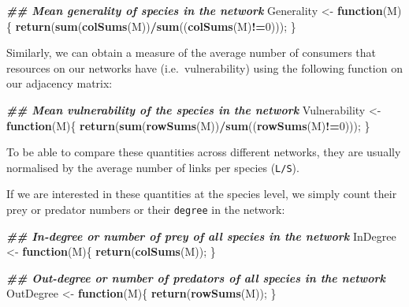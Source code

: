 \documentclass[
]{article}
\newenvironment{Shaded}{\begin{snugshade}}{\end{snugshade}}
\newcommand{\ControlFlowTok}[1]{\textcolor[rgb]{0.13,0.29,0.53}{\textbf{#1}}}
\newcommand{\DecValTok}[1]{\textcolor[rgb]{0.00,0.00,0.81}{#1}}
\newcommand{\DocumentationTok}[1]{\textcolor[rgb]{0.56,0.35,0.01}{\textbf{\textit{#1}}}}
\newcommand{\FunctionTok}[1]{\textcolor[rgb]{0.13,0.29,0.53}{\textbf{#1}}}
\newcommand{\NormalTok}[1]{#1}
\newcommand{\OtherTok}[1]{\textcolor[rgb]{0.56,0.35,0.01}{#1}}
\newcommand{\SpecialCharTok}[1]{\textcolor[rgb]{0.81,0.36,0.00}{\textbf{#1}}}
\begin{document}
\begin{Shaded}
\begin{Highlighting}[]
\DocumentationTok{\#\# Mean generality of species in the network}
\NormalTok{Generality }\OtherTok{\textless{}{-}} \ControlFlowTok{function}\NormalTok{(M)\{}
  \FunctionTok{return}\NormalTok{(}\FunctionTok{sum}\NormalTok{(}\FunctionTok{colSums}\NormalTok{(M))}\SpecialCharTok{/}\FunctionTok{sum}\NormalTok{((}\FunctionTok{colSums}\NormalTok{(M)}\SpecialCharTok{!=}\DecValTok{0}\NormalTok{)));}
\NormalTok{\}}
\end{Highlighting}
\end{Shaded}

Similarly, we can obtain a measure of the average number of consumers
that resources on our networks have (i.e.~vulnerability) using the
following function on our adjacency matrix:

\begin{Shaded}
\begin{Highlighting}[]
\DocumentationTok{\#\# Mean vulnerability of the species in the network}
\NormalTok{Vulnerability }\OtherTok{\textless{}{-}} \ControlFlowTok{function}\NormalTok{(M)\{}
  \FunctionTok{return}\NormalTok{(}\FunctionTok{sum}\NormalTok{(}\FunctionTok{rowSums}\NormalTok{(M))}\SpecialCharTok{/}\FunctionTok{sum}\NormalTok{((}\FunctionTok{rowSums}\NormalTok{(M)}\SpecialCharTok{!=}\DecValTok{0}\NormalTok{)));}
\NormalTok{\}}
\end{Highlighting}
\end{Shaded}

To be able to compare these quantities across different networks, they
are usually normalised by the average number of links per species
(\texttt{L/S}).

If we are interested in these quantities at the species level, we simply
count their prey or predator numbers or their \texttt{degree} in the
network:

\begin{Shaded}
\begin{Highlighting}[]
\DocumentationTok{\#\# In{-}degree or number of prey of all species in the network}
\NormalTok{InDegree }\OtherTok{\textless{}{-}} \ControlFlowTok{function}\NormalTok{(M)\{}
  \FunctionTok{return}\NormalTok{(}\FunctionTok{colSums}\NormalTok{(M));}
\NormalTok{\}}

\DocumentationTok{\#\# Out{-}degree or number of predators of all species in the network}
\NormalTok{OutDegree }\OtherTok{\textless{}{-}} \ControlFlowTok{function}\NormalTok{(M)\{}
  \FunctionTok{return}\NormalTok{(}\FunctionTok{rowSums}\NormalTok{(M));}
\NormalTok{\}}
\end{Highlighting}
\end{Shaded}
\end{document}
